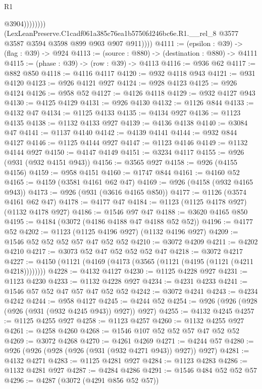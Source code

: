 \begin{lexlean}{R1}
\begin{coremodule}
                          @3904))))))))
          (LexLeanPreserve.C1cadf061a385c76ea1b5750fd246bc6e.R1.__rel_8
            @3577
            @3587
            @3594
            @3598
            @899
            @903
            @907
            @911))))
@4111 := (epsilon : @39) -> (flag : @39) -> @924
@4113 := (source : @880) -> (destination : @880) -> @4111
@4115 := (phase : @39) -> (row : @39) -> @4113
@4116 := @936 @62
@4117 := @882 @850
@4118 := @4116 @4117
@4120 := @932 @4118 @943
@4121 := @931 @4120
@4123 := @926 @4121 @927
@4124 := @928 @4123
@4125 := @926 @4124
@4126 := @958 @52
@4127 := @4126 @4118
@4129 := @932 @4127 @943
@4130 := @4125 @4129
@4131 := @926 @4130
@4132 := @1126 @844
@4133 := @4132 @47
@4134 := @1125 @4133
@4135 := @4134 @927
@4136 := @1123 @4135
@4138 := @1132 @4133 @927
@4139 := @4136 @4138
@4140 := @3084 @47
@4141 := @1137 @4140
@4142 := @4139 @4141
@4144 := @932 @844 @4127
@4146 := @1125 @4144 @927
@4147 := @1123 @4146
@4149 := @1132 @4144 @927
@4150 := @4147 @4149
@4151 := @3234 @4117
@4155 := @926 (@931 (@932 @4151 @943))
@4156 := @3565 @927
@4158 := @926 (@4155 @4156)
@4159 := @958 @4151
@4160 := @1747 @844
@4161 := @4160 @52
@4165 := @4159 (@3581 @4161 @62 @47)
@4169 := @926 (@4158 (@932 @4165 @943))
@4173 := @926 (@931 (@3616 @4165 @850))
@4177 := @1126 (@3574 @4161 @62 @47)
@4178 := @4177 @47
@4184 := @1123 (@1125 @4178 @927) (@1132 @4178 @927)
@4186 := @1546 @97 @47
@4188 := @3620 @4165 @850
@4195 := @4184 (@3072 (@4186 @4188 @47 @4188 @52 @52))
@4196 := @4177 @52
@4202 := @1123 (@1125 @4196 @927) (@1132 @4196 @927)
@4209 := @1546 @52 @52 @52 @57 @47 @52 @52
@4210 := @3072 @4209
@4211 := @4202 @4210
@4217 := @3073 @52 @47 @52 @52 @52 @47
@4218 := @3072 @4217
@4227 := @4150 (@1121 (@4169 (@4173 (@3565 (@1121 (@4195 (@1121 (@4211 @4218))))))))
@4228 := @4132 @4127
@4230 := @1125 @4228 @927
@4231 := @1123 @4230
@4233 := @1132 @4228 @927
@4234 := @4231 @4233
@4241 := @1546 @57 @52 @47 @57 @47 @52 @52
@4242 := @3072 @4241
@4243 := @4234 @4242
@4244 := @958 @4127
@4245 := @4244 @52
@4254 := @926 (@926 (@928 (@926 (@931 (@932 @4245 @943)) @927)) @927)
@4255 := @4132 @4245
@4257 := @1125 @4255 @927
@4258 := @1123 @4257
@4260 := @1132 @4255 @927
@4261 := @4258 @4260
@4268 := @1546 @107 @52 @52 @57 @47 @52 @52
@4269 := @3072 @4268
@4270 := @4261 @4269
@4271 := @4244 @57
@4280 := @926 (@926 (@928 (@926 (@931 (@932 @4271 @943)) @927)) @927)
@4281 := @4132 @4271
@4283 := @1125 @4281 @927
@4284 := @1123 @4283
@4286 := @1132 @4281 @927
@4287 := @4284 @4286
@4291 := @1546 @484 @52 @52 @57
@4296 := @4287 (@3072 (@4291 @856 @52 @57))

\end{coremodule}
\end{lexlean}
